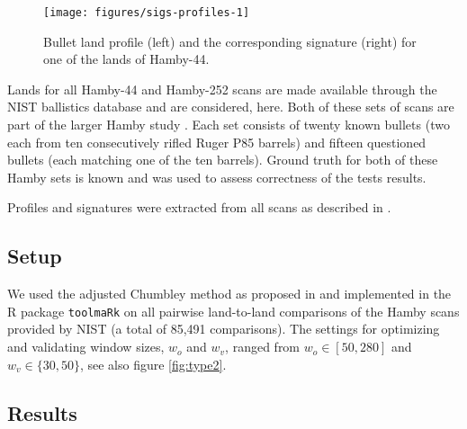 \documentclass[12pt]{article}
\begin{document}

\begin{figure}

{\centering \texttt{[image: figures/sigs-profiles-1]} 

}

\caption{Bullet land profile (left) and the corresponding signature (right) for one of the lands of Hamby-44.}\label{fig:sigs-profiles}
\end{figure}

Lands for all Hamby-44 and Hamby-252 scans are made available through
the NIST ballistics database \citep{nist} and are considered, here. Both
of these sets of scans are part of the larger Hamby study \citep{hamby}.
Each set consists of twenty known bullets (two each from ten
consecutively rifled Ruger P85 barrels) and fifteen questioned bullets
(each matching one of the ten barrels). Ground truth for both of these
Hamby sets is known and was used to assess correctness of the tests
results.


Profiles and signatures were extracted from all scans as described in
\citet{aoas}.

\subsection{Setup}\label{setup}


We used the adjusted Chumbley method as proposed in \citet{hadler} and
implemented in the R package \texttt{toolmaRk} \citep{toolmark} on all
pairwise land-to-land comparisons of the Hamby scans provided by NIST (a
total of 85,491 comparisons). The settings for optimizing and validating
window sizes, \(w_o\) and \(w_v\), ranged from \(w_o \in [50, 280]\) and
\(w_v \in \{30, 50\}\), see also figure \ref{fig:type2}.

\subsection{Results}\label{results}
\end{document}
